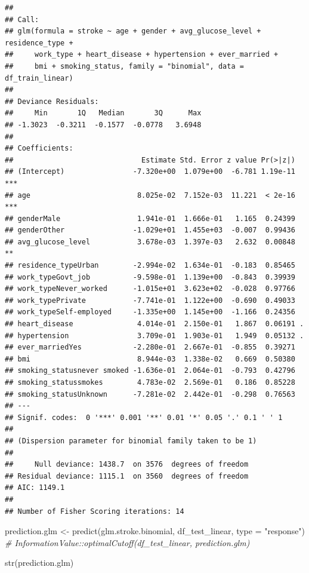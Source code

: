 \documentclass[
]{article}
\newenvironment{Shaded}{\begin{snugshade}}{\end{snugshade}}
\newcommand{\AttributeTok}[1]{\textcolor[rgb]{0.77,0.63,0.00}{#1}}
\newcommand{\CommentTok}[1]{\textcolor[rgb]{0.56,0.35,0.01}{\textit{#1}}}
\newcommand{\FunctionTok}[1]{\textcolor[rgb]{0.00,0.00,0.00}{#1}}
\newcommand{\NormalTok}[1]{#1}
\newcommand{\OtherTok}[1]{\textcolor[rgb]{0.56,0.35,0.01}{#1}}
\newcommand{\StringTok}[1]{\textcolor[rgb]{0.31,0.60,0.02}{#1}}
\renewcommand{\=}[1]{\stackrel{#1}{=}}
\theoremstyle{definition}
\theoremstyle{remark}
\begin{document}
\begin{verbatim}
## 
## Call:
## glm(formula = stroke ~ age + gender + avg_glucose_level + residence_type + 
##     work_type + heart_disease + hypertension + ever_married + 
##     bmi + smoking_status, family = "binomial", data = df_train_linear)
## 
## Deviance Residuals: 
##     Min       1Q   Median       3Q      Max  
## -1.3023  -0.3211  -0.1577  -0.0778   3.6948  
## 
## Coefficients:
##                              Estimate Std. Error z value Pr(>|z|)    
## (Intercept)                -7.320e+00  1.079e+00  -6.781 1.19e-11 ***
## age                         8.025e-02  7.152e-03  11.221  < 2e-16 ***
## genderMale                  1.941e-01  1.666e-01   1.165  0.24399    
## genderOther                -1.029e+01  1.455e+03  -0.007  0.99436    
## avg_glucose_level           3.678e-03  1.397e-03   2.632  0.00848 ** 
## residence_typeUrban        -2.994e-02  1.634e-01  -0.183  0.85465    
## work_typeGovt_job          -9.598e-01  1.139e+00  -0.843  0.39939    
## work_typeNever_worked      -1.015e+01  3.623e+02  -0.028  0.97766    
## work_typePrivate           -7.741e-01  1.122e+00  -0.690  0.49033    
## work_typeSelf-employed     -1.335e+00  1.145e+00  -1.166  0.24356    
## heart_disease               4.014e-01  2.150e-01   1.867  0.06191 .  
## hypertension                3.709e-01  1.903e-01   1.949  0.05132 .  
## ever_marriedYes            -2.280e-01  2.667e-01  -0.855  0.39271    
## bmi                         8.944e-03  1.338e-02   0.669  0.50380    
## smoking_statusnever smoked -1.636e-01  2.064e-01  -0.793  0.42796    
## smoking_statussmokes        4.783e-02  2.569e-01   0.186  0.85228    
## smoking_statusUnknown      -7.281e-02  2.442e-01  -0.298  0.76563    
## ---
## Signif. codes:  0 '***' 0.001 '**' 0.01 '*' 0.05 '.' 0.1 ' ' 1
## 
## (Dispersion parameter for binomial family taken to be 1)
## 
##     Null deviance: 1438.7  on 3576  degrees of freedom
## Residual deviance: 1115.1  on 3560  degrees of freedom
## AIC: 1149.1
## 
## Number of Fisher Scoring iterations: 14
\end{verbatim}

\begin{Shaded}
\begin{Highlighting}[]
\NormalTok{prediction.glm }\OtherTok{\textless{}{-}} \FunctionTok{predict}\NormalTok{(glm.stroke.binomial, df\_test\_linear, }\AttributeTok{type =} \StringTok{"response"}\NormalTok{)}
\CommentTok{\# InformationValue::optimalCutoff(df\_test\_linear, prediction.glm)}

\FunctionTok{str}\NormalTok{(prediction.glm)}
\end{Highlighting}
\end{Shaded}
\end{document}
